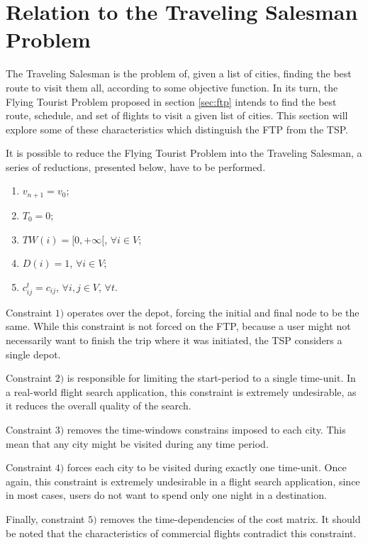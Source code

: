 \section{Relation to the Traveling Salesman Problem}
\label{sec:ftp_tsp}

The Traveling Salesman is the problem of, given a list of cities, finding the best route to visit them all, according to some objective function. In its turn, the Flying Tourist Problem proposed in section \ref{sec:ftp} intends to find the best route, schedule, and set of flights to visit a given list of cities. This section will explore some of these characteristics which distinguish the FTP from the TSP.

It is possible to reduce the Flying Tourist Problem into the Traveling Salesman, a series of reductions, presented below, have to be performed. 

\begin{enumerate}
      \item $v_{n+1} = v_0$;
      \item $T_0 = 0$;
      \item $TW(i) = [0, +\infty[$, $\forall i \in V$;
      \item $D(i) = 1$, $\forall i \in V$;
    \item $c_{ij}^{t} = c_{ij}$, $\forall i, j \in V$, $\forall t$.
\end{enumerate}

Constraint $1)$ operates over the depot, forcing the initial and final node to be the same. While this constraint is not forced on the FTP, because a user might not necessarily want to finish the trip where it was initiated, the TSP considers a single depot. 

Constraint $2)$ is responsible for limiting the start-period to a single time-unit. In a real-world flight search application, this constraint is extremely undesirable, as it reduces the overall quality of the search.

Constraint $3)$ removes the time-windows constrains imposed to each city. This mean that any city might be visited during any time period.

Constraint $4)$ forces each city to be visited during exactly one time-unit. Once again, this constraint is extremely undesirable in a flight search application, since in most cases, users do not want to spend only one night in a destination.

Finally, constraint $5)$ removes the time-dependencies of the cost matrix. It should be noted that the characteristics of commercial flights contradict this constraint.

